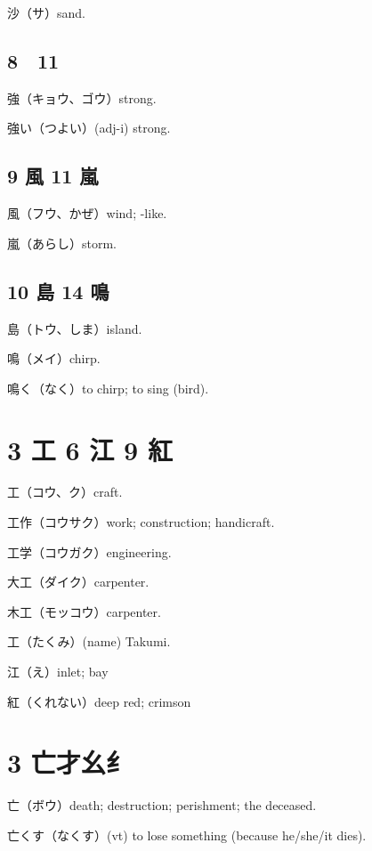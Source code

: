 沙（サ）sand.

\subsection{8 𧈧 11 強}

強（キョウ、ゴウ）strong.

強い（つよい）(adj-i) strong.

\subsection{9 風 11 嵐}

風（フウ、かぜ）wind; -like.

嵐（あらし）storm.

\subsection{10 島 14 鳴}

島（トウ、しま）island.

鳴（メイ）chirp.

鳴く（なく）to chirp; to sing (bird).

\section{3 工 6 江 9 紅}

工（コウ、ク）craft.

工作（コウサク）work; construction; handicraft.

工学（コウガク）engineering.

大工（ダイク）carpenter.

木工（モッコウ）carpenter.

工（たくみ）(name) Takumi.

江（え）inlet; bay

紅（くれない）deep red; crimson

\section{3 亡才幺纟}

亡（ボウ）death; destruction; perishment; the deceased.

亡くす（なくす）(vt) to lose something (because he/she/it dies).


